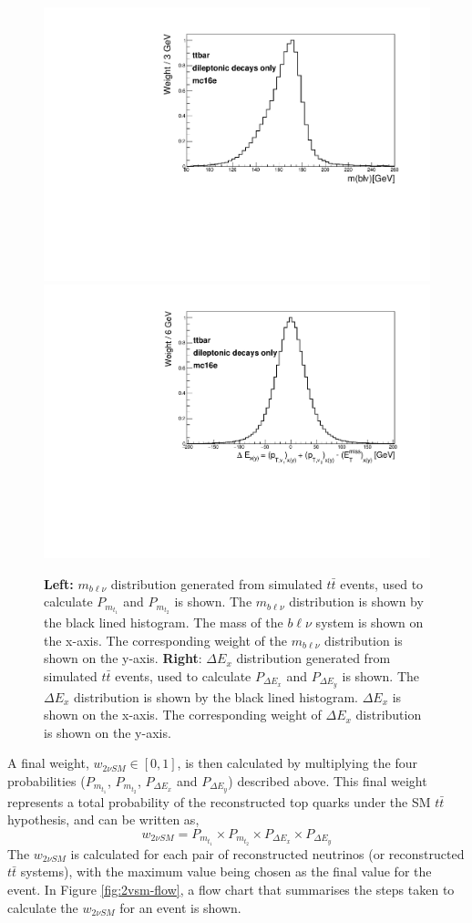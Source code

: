 \begin{figure}[h!]
	\includegraphics[width=0.47\linewidth]{figures/mtop_2vSM.pdf}
	\includegraphics[width=0.47\linewidth]{figures/DExy_2vSM.pdf}
	\centering
	\caption{\textbf{Left:} $m_{b\ell\nu}$ distribution generated from simulated $t\bar{t}$ events, used to calculate $P_{m_{t_{1}}}$ and $P_{m_{t_{2}}}$ is shown. The $m_{b\ell\nu}$ distribution is shown by the black lined histogram. The mass of the $b\ell\nu$ system is shown on the x-axis. The corresponding weight of the $m_{b\ell\nu}$ distribution is shown on the y-axis. \textbf{Right}: $\Delta E_{x}$ distribution generated from simulated $t\bar{t}$ events, used to calculate $P_{\Delta E_{x}}$ and $P_{\Delta E_{y}}$ is shown. The $\Delta E_{x}$ distribution is shown by the black lined histogram. $\Delta E_{x}$ is shown on the x-axis. The corresponding weight of $\Delta E_{x}$ distribution is shown on the y-axis. }
	\label{fig:2vSM-mass-dist}
\end{figure}A final weight, $w_{2\nu SM} \in [0,1]$, is then calculated by multiplying the four probabilities ($P_{m_{t_{1}}}$, $P_{m_{t_{2}}}$, $P_{\Delta E_{x}}$ and $P_{\Delta E_{y}}$) described above. This final weight represents a total probability of the reconstructed top quarks under the SM $t\bar{t}$ hypothesis, and can be written as,
\begin{equation}
    w_{2\nu SM} = P_{m_{t_{1}}} \times P_{m_{t_{2}}} \times P_{\Delta E_{x}} \times P_{\Delta E_{y}}
\end{equation}
The $w_{2\nu SM}$ is calculated for each pair of reconstructed neutrinos (or reconstructed $t\bar{t}$ systems), with the maximum value being chosen as the final value for the event. In Figure \ref{fig:2vsm-flow}, a flow chart that summarises the steps taken to calculate the $w_{2\nu SM}$ for an event is shown.
